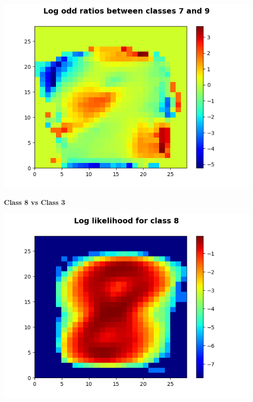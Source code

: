 \documentclass[11pt]{article}
\begin{document}
\begin{center}
\includegraphics[scale=1]{part1/1/odd_ratio_7_9.png}
\end{center}

\pagebreak
\textbf{Class 8 vs Class 3}\\
\begin{center}
\includegraphics[scale=0.75]{part1/1/log_likelihood_8.png}
\end{center}
\end{document}
